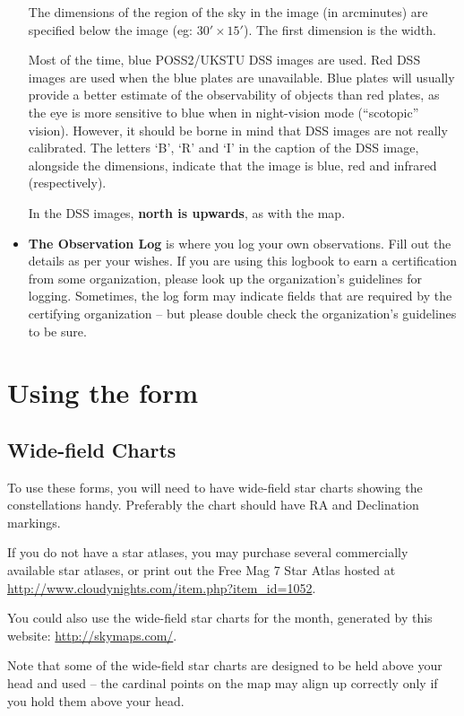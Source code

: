 \begin{itemize}
  The dimensions of the region of the sky in the image (in arcminutes)
  are specified below the image (eg: $30' \times 15'$). The first
  dimension is the width.

  Most of the time, blue POSS2/UKSTU DSS images are used. Red DSS
  images are used when the blue plates are unavailable. Blue plates
  will usually provide a better estimate of the observability of
  objects than red plates, as the eye is more sensitive to blue when
  in night-vision mode (``scotopic'' vision). However, it should be
  borne in mind that DSS images are not really calibrated. The letters
  `B', `R' and `I' in the caption of the DSS image, alongside the
  dimensions, indicate that the image is blue, red and infrared
  (respectively).

  In the DSS images, \textbf{north is upwards}, as with the map.

\item \textbf{The Observation Log} is where you log your own
  observations. Fill out the details as per your wishes. If you are
  using this logbook to earn a certification from some organization,
  please look up the organization's guidelines for logging. Sometimes,
  the log form may indicate fields that are required by the certifying
  organization -- but please double check the organization's
  guidelines to be sure.

\end{itemize}

\section{Using the form}

\subsection{Wide-field Charts}
To use these forms, you will need to have wide-field star charts
showing the constellations handy. Preferably the chart should have RA
and Declination markings.

If you do not have a star atlases, you may purchase several
commercially available star atlases, or print out the Free Mag 7 Star
Atlas hosted at
\url{http://www.cloudynights.com/item.php?item_id=1052}.

You could also use the wide-field star charts for the month, generated
by this website: \url{http://skymaps.com/}.

Note that some of the wide-field star charts are designed to be held
above your head and used -- the cardinal points on the map may align
up correctly only if you hold them above your head.

